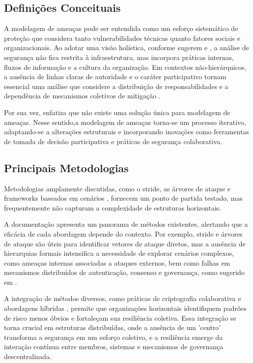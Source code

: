 \subsection{Definições Conceituais} 
\label{sec:definicoes_conceituais}

A modelagem de ameaças pode ser entendida como um esforço sistemático de
proteção que considera tanto vulnerabilidades técnicas quanto fatores
sociais e organizacionais. Ao adotar uma visão holística, conforme sugerem
\cite{ThreatModelingAsABasisForSecurityRequirements} e
\cite{AdvancedThreatModeling}, a análise de segurança não fica restrita à
infraestrutura, mas incorpora práticas internas, fluxos de informação e a
cultura da organização. Em contextos não-hierárquicos, a ausência de linhas
claras de autoridade e o caráter participativo tornam essencial uma análise
que considere a distribuição de responsabilidades e a dependência de
mecanismos coletivos de mitigação \cite{Colbac}.

Por sua vez, \cite{DemystifyingTheThreatModelingProcess} enfatiza que não
existe uma solução única para modelagem de ameaças. Nesse sentido,a
modelagem de ameaças torna-se um processo iterativo, adaptando-se a
alterações estruturais e incorporando inovações como ferramentas de
tomada de decisão participativa e práticas de segurança colaborativa.

\subsection{Principais Metodologias}
\label{sec:principais_metodologias}

Metodologias amplamente discutidas, como o \gls{stride}, as árvores de
ataque e frameworks baseados em cenários
\cite{EvaluationofCompetingThreatModeling}, fornecem um ponto de partida
testado, mas frequentemente não capturam a complexidade de estruturas
horizontais.

A documentação \cite{ThreatModelingASummaryOfAvailableMethods} apresenta um
panorama de métodos existentes, alertando que a eficácia de cada abordagem
depende do contexto. Por exemplo, \gls{stride} e árvores de ataque são
úteis para identificar vetores de ataque diretos, mas a ausência de
hierarquias formais intensifica a necessidade de explorar cenários
complexos, como ameaças internas associadas a ataques externos, bem como
falhas em mecanismos distribuídos de autenticação, consenso e governança,
como sugerido em \cite{Colbac}.

A integração de métodos diversos, como práticas de criptografia
colaborativa \cite{AbcCrypto} e abordagens híbridas \cite{CoReTM}, permite
que organizações horizontais identifiquem padrões de risco menos óbvios e
fortaleçam sua resiliência coletiva. Essa integração se torna crucial em
estruturas distribuídas, onde a ausência de um 'centro' transforma a
segurança em um esforço coletivo, e a resiliência emerge da interação
contínua entre membros, sistemas e mecanismos de governança
descentralizada.

